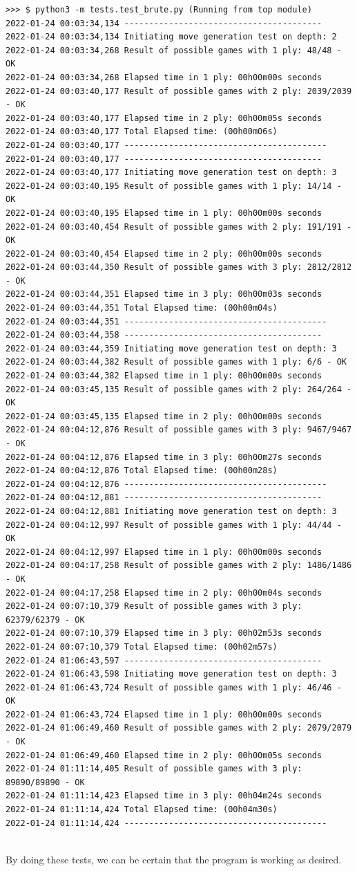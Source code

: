 \documentclass[10pt]{article}
\begin{document}
\begin{lstlisting}
>>> $ python3 -m tests.test_brute.py (Running from top module)
2022-01-24 00:03:34,134 ----------------------------------------
2022-01-24 00:03:34,134 Initiating move generation test on depth: 2
2022-01-24 00:03:34,268 Result of possible games with 1 ply: 48/48 - OK
2022-01-24 00:03:34,268 Elapsed time in 1 ply: 00h00m00s seconds
2022-01-24 00:03:40,177 Result of possible games with 2 ply: 2039/2039 - OK
2022-01-24 00:03:40,177 Elapsed time in 2 ply: 00h00m05s seconds
2022-01-24 00:03:40,177 Total Elapsed time: (00h00m06s)
2022-01-24 00:03:40,177 -----------------------------------------
2022-01-24 00:03:40,177 ----------------------------------------
2022-01-24 00:03:40,177 Initiating move generation test on depth: 3
2022-01-24 00:03:40,195 Result of possible games with 1 ply: 14/14 - OK
2022-01-24 00:03:40,195 Elapsed time in 1 ply: 00h00m00s seconds
2022-01-24 00:03:40,454 Result of possible games with 2 ply: 191/191 - OK
2022-01-24 00:03:40,454 Elapsed time in 2 ply: 00h00m00s seconds
2022-01-24 00:03:44,350 Result of possible games with 3 ply: 2812/2812 - OK
2022-01-24 00:03:44,351 Elapsed time in 3 ply: 00h00m03s seconds
2022-01-24 00:03:44,351 Total Elapsed time: (00h00m04s)
2022-01-24 00:03:44,351 -----------------------------------------
2022-01-24 00:03:44,358 ----------------------------------------
2022-01-24 00:03:44,359 Initiating move generation test on depth: 3
2022-01-24 00:03:44,382 Result of possible games with 1 ply: 6/6 - OK
2022-01-24 00:03:44,382 Elapsed time in 1 ply: 00h00m00s seconds
2022-01-24 00:03:45,135 Result of possible games with 2 ply: 264/264 - OK
2022-01-24 00:03:45,135 Elapsed time in 2 ply: 00h00m00s seconds
2022-01-24 00:04:12,876 Result of possible games with 3 ply: 9467/9467 - OK
2022-01-24 00:04:12,876 Elapsed time in 3 ply: 00h00m27s seconds
2022-01-24 00:04:12,876 Total Elapsed time: (00h00m28s)
2022-01-24 00:04:12,876 -----------------------------------------
2022-01-24 00:04:12,881 ----------------------------------------
2022-01-24 00:04:12,881 Initiating move generation test on depth: 3
2022-01-24 00:04:12,997 Result of possible games with 1 ply: 44/44 - OK
2022-01-24 00:04:12,997 Elapsed time in 1 ply: 00h00m00s seconds
2022-01-24 00:04:17,258 Result of possible games with 2 ply: 1486/1486 - OK
2022-01-24 00:04:17,258 Elapsed time in 2 ply: 00h00m04s seconds
2022-01-24 00:07:10,379 Result of possible games with 3 ply: 62379/62379 - OK
2022-01-24 00:07:10,379 Elapsed time in 3 ply: 00h02m53s seconds
2022-01-24 00:07:10,379 Total Elapsed time: (00h02m57s)
2022-01-24 01:06:43,597 ----------------------------------------
2022-01-24 01:06:43,598 Initiating move generation test on depth: 3
2022-01-24 01:06:43,724 Result of possible games with 1 ply: 46/46 - OK
2022-01-24 01:06:43,724 Elapsed time in 1 ply: 00h00m00s seconds
2022-01-24 01:06:49,460 Result of possible games with 2 ply: 2079/2079 - OK
2022-01-24 01:06:49,460 Elapsed time in 2 ply: 00h00m05s seconds
2022-01-24 01:11:14,405 Result of possible games with 3 ply: 89890/89890 - OK
2022-01-24 01:11:14,423 Elapsed time in 3 ply: 00h04m24s seconds
2022-01-24 01:11:14,424 Total Elapsed time: (00h04m30s)
2022-01-24 01:11:14,424 -----------------------------------------
    
\end{lstlisting}

By doing these tests, we can be certain that the program is working as desired.
\end{document}
